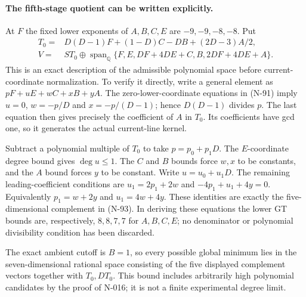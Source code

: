 \paragraph{The fifth-stage quotient can be written explicitly.}
At $F$ the fixed lower exponents of $A,B,C,E$ are $-9,-9,-8,-8$.
Put
\[
 \begin{split}
 T_0={}&D(D-1)F+(1-D)C-DB+(2D-3)A/2,\\
 V={}&S T_0\oplus\operatorname{span}_{\mathbb Q}
       \{F,E,DF+4DE+C,B,2DF+4DE+A\}.
 \end{split}
 \tag{N-93}
\]
This is an exact description of the admissible polynomial space
before current-coordinate normalization.  To verify it directly,
write a general element as $pF+uE+wC+xB+yA$.
The zero-lower-coordinate equations in (N-91) imply $u=0$,
$w=-p/D$ and $x=-p/(D-1)$; hence $D(D-1)$ divides $p$.
The last equation then gives precisely the coefficient of $A$ in
$T_0$.  Its coefficients have gcd one, so it generates the actual
current-line kernel.

Subtract a polynomial multiple of $T_0$ to take
$p=p_0+p_1D$.  The $E$-coordinate degree bound gives $\deg u\le1$.
The $C$ and $B$ bounds force $w,x$ to be constants, and the $A$
bound forces $y$ to be constant.  Write $u=u_0+u_1D$.
The remaining leading-coefficient conditions are
$u_1=2p_1+2w$ and $-4p_1+u_1+4y=0$.
Equivalently $p_1=w+2y$ and $u_1=4w+4y$.
These identities are exactly the five-dimensional complement in
(N-93).  In deriving these equations the lower GT bounds are,
respectively, $8,8,7,7$ for $A,B,C,E$; no denominator or polynomial
divisibility condition has been discarded.

The exact ambient cutoff is $B=1$, so every possible global minimum
lies in the seven-dimensional rational space consisting of the five
displayed complement vectors together with $T_0,DT_0$.
This bound includes arbitrarily high polynomial candidates by the
proof of N-016; it is not a finite experimental degree limit.

